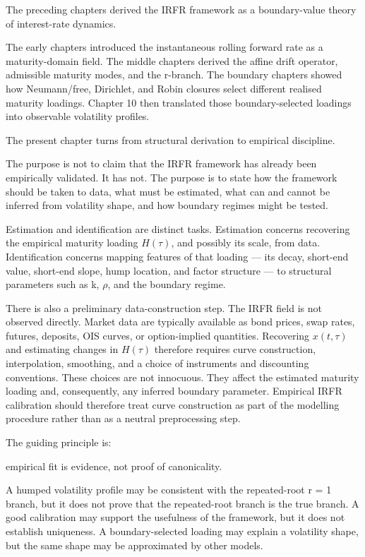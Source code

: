 \documentclass[11pt,oneside]{book}
\begin{document}
The preceding chapters derived the IRFR framework as a boundary-value
theory of interest-rate dynamics.

The early chapters introduced the instantaneous rolling forward rate as
a maturity-domain field. The middle chapters derived the affine drift
operator, admissible maturity modes, and the r-branch. The boundary
chapters showed how Neumann/free, Dirichlet, and Robin closures select
different realised maturity loadings. Chapter 10 then translated those
boundary-selected loadings into observable volatility profiles.

The present chapter turns from structural derivation to empirical
discipline.

The purpose is not to claim that the IRFR framework has already been
empirically validated. It has not. The purpose is to state how the
framework should be taken to data, what must be estimated, what can and
cannot be inferred from volatility shape, and how boundary regimes might
be tested.

Estimation and identification are distinct tasks. Estimation concerns
recovering the empirical maturity loading $H(\tau)$, and possibly its scale,
from data. Identification concerns mapping features of that loading ---
its decay, short-end value, short-end slope, hump location, and factor
structure --- to structural parameters such as k, $\rho$, and the boundary
regime.

There is also a preliminary data-construction step. The IRFR field is
not observed directly. Market data are typically available as bond
prices, swap rates, futures, deposits, OIS curves, or option-implied
quantities. Recovering $x(t,\tau)$ and estimating changes in $H(\tau)$ therefore
requires curve construction, interpolation, smoothing, and a choice of
instruments and discounting conventions. These choices are not
innocuous. They affect the estimated maturity loading and, consequently,
any inferred boundary parameter. Empirical IRFR calibration should
therefore treat curve construction as part of the modelling procedure
rather than as a neutral preprocessing step.

The guiding principle is:

empirical fit is evidence, not proof of canonicality.

A humped volatility profile may be consistent with the repeated-root r =
1 branch, but it does not prove that the repeated-root branch is the
true branch. A good calibration may support the usefulness of the
framework, but it does not establish uniqueness. A boundary-selected
loading may explain a volatility shape, but the same shape may be
approximated by other models.
\end{document}
